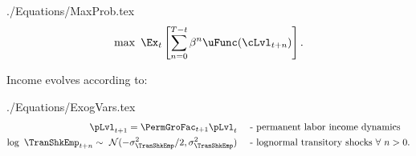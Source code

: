 \documentclass[titlepage, headings=optiontotocandhead]{\econtex}
\begin{document}


\begin{verbatimwrite}{./Equations/MaxProb.tex}
  \begin{equation}\label{eq:MaxProb}
    \max ~ \Ex_{t}\left[ \sum_{n=0}^{T-t} {\DiscAlt}^{n} \uFunc({\cLvl}_{t+n})\right].
  \end{equation}
\end{verbatimwrite}
\unskip

Income evolves according to: 
\begin{verbatimwrite}{./Equations/ExogVars.tex}
  \begin{equation}\begin{gathered}\begin{aligned}
         \pLvl_{t+1}  = \PermGroFac_{t+1}\pLvl_{t}  &  \text{~~~ - permanent labor income dynamics} \label{eq:permincgrow}
        \\ \log ~ \TranShkEmp_{t+n} \sim ~\mathcal{N}(-\sigma_{\TranShkEmp}^{2}/2,\sigma_{\TranShkEmp}^{2}) & \text{~~~ - lognormal transitory shocks}~\forall~n>0 .
      \end{aligned}\end{gathered}\end{equation}
\end{verbatimwrite}
\unskip
\end{document}
